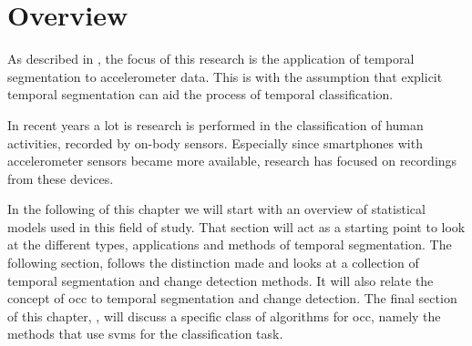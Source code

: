 \section{Overview}\label{sec:literature_review_overview}
As described in , the focus of this research is the application of temporal segmentation to accelerometer data.
This is with the assumption that explicit temporal segmentation can aid the process of temporal classification.


In recent years a lot is research is performed in the classification of human activities, recorded by on-body sensors.
Especially since smartphones with accelerometer sensors became more available, research has focused on recordings from these devices.


In the following of this chapter we will start with an overview of statistical models used in this field of study.
That section will act as a starting point to look at the different types, applications and methods of temporal segmentation.
The following section,  follows the distinction made and looks at a collection of temporal segmentation and change detection methods.
It will also relate the concept of \gls{occ} to temporal segmentation and change detection.
The final section of this chapter, , will discuss a specific class of algorithms for \gls{occ}, namely the methods that use \glspl{svm} for the classification task.



